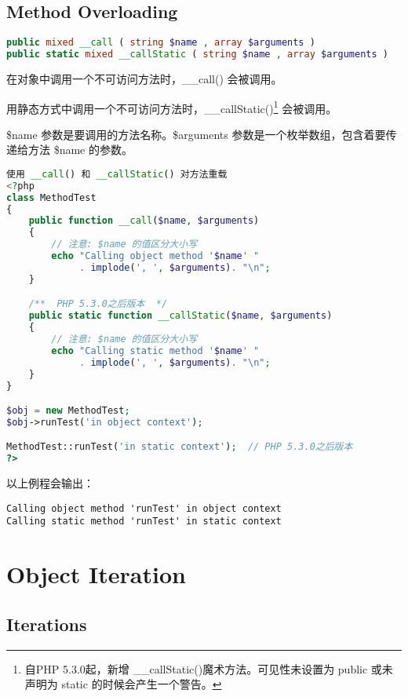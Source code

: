 \section{Method Overloading}


\begin{lstlisting}[language=PHP]
public mixed __call ( string $name , array $arguments )
public static mixed __callStatic ( string $name , array $arguments )
\end{lstlisting}

在对象中调用一个不可访问方法时，\_\_call() 会被调用。

用静态方式中调用一个不可访问方法时，\_\_callStatic()\footnote{自PHP 5.3.0起，新增 \_\_callStatic()魔术方法。可见性未设置为 public 或未声明为 static 的时候会产生一个警告。} 会被调用。

\$name 参数是要调用的方法名称。\$arguments 参数是一个枚举数组，包含着要传递给方法 \$name 的参数。

\begin{lstlisting}[language=PHP]
使用 __call() 和 __callStatic() 对方法重载
<?php
class MethodTest 
{
    public function __call($name, $arguments) 
    {
        // 注意: $name 的值区分大小写
        echo "Calling object method '$name' "
             . implode(', ', $arguments). "\n";
    }

    /**  PHP 5.3.0之后版本  */
    public static function __callStatic($name, $arguments) 
    {
        // 注意: $name 的值区分大小写
        echo "Calling static method '$name' "
             . implode(', ', $arguments). "\n";
    }
}

$obj = new MethodTest;
$obj->runTest('in object context');

MethodTest::runTest('in static context');  // PHP 5.3.0之后版本
?>
\end{lstlisting}

以上例程会输出：

\begin{verbatim}
Calling object method 'runTest' in object context
Calling static method 'runTest' in static context
\end{verbatim}


\chapter{Object Iteration}


\section{Iterations}


